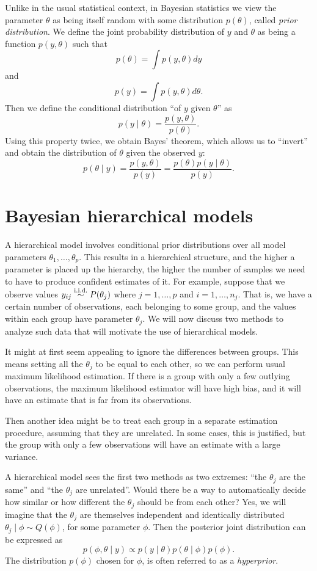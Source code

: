\documentclass[a4paper, 11pt, oneside]{report}
\newcommand{\iid}{\stackrel{\textmd{i.i.d.}}{\sim}}
\newcommand{\1}{\mathds{1}}
\begin{document}
Unlike in the usual statistical context, in Bayesian statistics we view the parameter $\theta$ as
being itself random with some distribution $p(\theta)$, called \emph{prior distribution}. We define the joint
probability distribution of $y$ and $\theta$ as being a function $p(y,\theta)$ such that
\[p(\theta) = \int p(y,\theta) dy\]
and
\[p(y)  = \int p(y,\theta) d\theta.\]
Then we define the conditional distribution ``of $y$ given $\theta$'' as
\[
	p(y \mid \theta) = \frac{p(y,\theta)}{p(\theta)}.
\]
Using this property twice, we obtain Bayes' theorem, which allows us to ``invert''
and obtain the distribution of $\theta$ given the observed $y$:
\[ p(\theta \mid y) = \frac{p(y,\theta)}{p(y)} = \frac{p(\theta)p(y \mid \theta)}{p(y)}. \]

\section{Bayesian hierarchical models}
A hierarchical model involves conditional prior distributions over all model parameters
$\theta_1, \dots, \theta_p$. This results in a hierarchical structure, and the
higher a parameter is placed
up the hierarchy, the higher the number of samples we need to have to produce
confident estimates of it.
For example, suppose that we observe values $y_{ij} \iid P(\theta_j)$ where $j=1,\dots,p$ and
$i=1,\dots,n_j$. That is, we have a certain number of observations,
each belonging to some group, and the values within each group have
parameter $\theta_j$. We will now discuss two methods to analyze such data
that will motivate the use of hierarchical models.

It might at first seem appealing to ignore the differences between groups. This
means setting all the $\theta_j$ to be equal to each other, so we can perform
usual maximum likelihood estimation. If there is a group with only a few
outlying observations, the maximum likelihood estimator will have high bias, and it will have an estimate that is far from its observations.

Then another idea might be to treat each group in a separate estimation procedure, assuming
that they are unrelated. In some cases, this is
justified, but the group with only a few
observations will have an estimate with a large variance.

A hierarchical model sees the first two methods as two
extremes: ``the $\theta_j$ are the same'' and ``the $\theta_j$ are unrelated''.
Would there be a way to automatically decide how similar or how different the $\theta_j$ should be from each other?
Yes, we will imagine that the $\theta_j$ are themselves independent and identically distributed
$\theta_j \mid \phi \sim Q(\phi)$, for some parameter $\phi$. Then the posterior
joint distribution can be expressed as
\[p(\phi, \theta \mid y) \propto p(y \mid \theta) p(\theta \mid \phi) p(\phi).\]
The distribution $p(\phi)$ chosen for $\phi$, is often
referred to as a \emph{hyperprior}.
\end{document}
